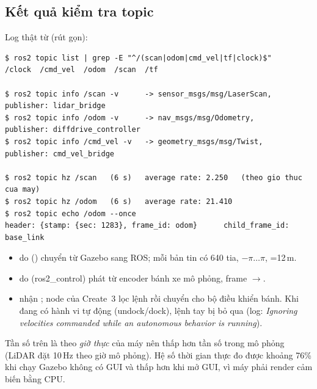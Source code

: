 \subsection{Kết quả kiểm tra topic}
Log thật từ  (rút gọn):
\begin{lstlisting}[numbers=none,basicstyle=\ttfamily\footnotesize,caption={Kiểm tra \code{/scan}, \code{/odom}, \code{/cmd\_vel} (\file{logs/01\_topic\_check.log}).}]
$ ros2 topic list | grep -E "^/(scan|odom|cmd_vel|tf|clock)$"
/clock  /cmd_vel  /odom  /scan  /tf

$ ros2 topic info /scan -v      -> sensor_msgs/msg/LaserScan,  publisher: lidar_bridge
$ ros2 topic info /odom -v      -> nav_msgs/msg/Odometry,      publisher: diffdrive_controller
$ ros2 topic info /cmd_vel -v   -> geometry_msgs/msg/Twist,    publisher: cmd_vel_bridge

$ ros2 topic hz /scan   (6 s)   average rate: 2.250   (theo gio thuc cua may)
$ ros2 topic hz /odom   (6 s)   average rate: 21.410
$ ros2 topic echo /odom --once
header: {stamp: {sec: 1283}, frame_id: odom}      child_frame_id: base_link
\end{lstlisting}
\begin{itemize}
\item {} do  () chuyển từ Gazebo sang ROS; mỗi bản tin có 640 tia, $-\pi\ldots\pi$, =12\,m.
\item {} do  (ros2\_control) phát từ encoder bánh xe mô phỏng, frame $\to$.
\item {} nhận ; node  của Create~3 lọc lệnh rồi chuyển cho bộ điều khiển bánh. Khi đang có hành vi tự động (undock/dock), lệnh tay bị bỏ qua (log: \emph{Ignoring velocities commanded while an autonomous behavior is running}).
\end{itemize}
Tần số trên là theo \emph{giờ thực} của máy nên thấp hơn tần số trong mô phỏng (LiDAR đặt 10\,Hz theo giờ mô phỏng). Hệ số thời gian thực đo được
khoảng 76\% khi chạy Gazebo không có GUI và thấp hơn khi mở GUI, vì máy phải render cảm biến bằng CPU.


